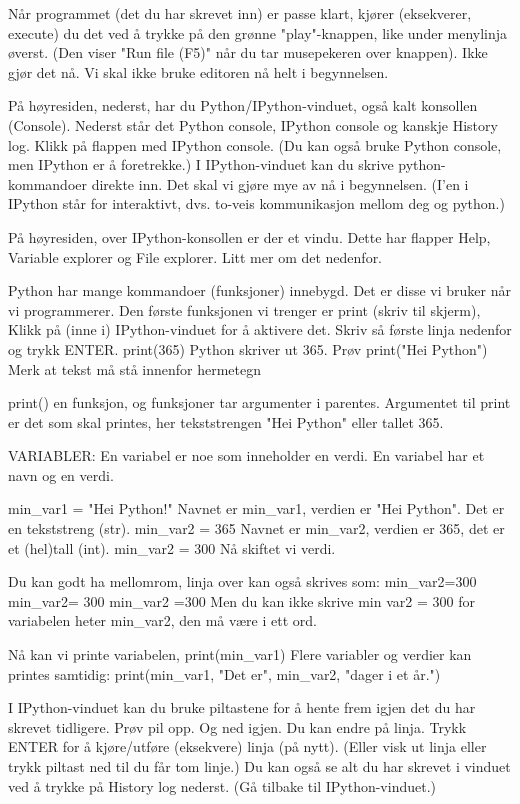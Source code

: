\documentclass[a4paper,11pt,utf8]{book}
\begin{document}
Når programmet (det du har skrevet inn) er passe klart, kjører (eksekverer, execute)
du det ved å trykke på den grønne "play"-knappen, like under menylinja øverst.
(Den viser "Run file (F5)" når du tar musepekeren over knappen).
Ikke gjør det nå. Vi skal ikke bruke editoren nå helt i begynnelsen.


På høyresiden, nederst, har du Python/IPython-vinduet, også kalt konsollen (Console).
Nederst står det Python console, IPython console og kanskje History log. 
Klikk på flappen med IPython console.
(Du kan også bruke Python console, men IPython er å foretrekke.) 
I IPython-vinduet kan du skrive python-kommandoer direkte inn. 
Det skal vi gjøre mye av nå i begynnelsen. 
(I'en i IPython står for interaktivt, dvs. to-veis kommunikasjon mellom deg og python.) 


På høyresiden, over IPython-konsollen er der et vindu.
Dette har flapper Help, Variable explorer og File explorer.
Litt mer om det nedenfor. 


Python har mange kommandoer (funksjoner) innebygd.
Det er disse vi bruker når vi programmerer. 
Den første funksjonen vi trenger er print (skriv til skjerm), 
Klikk på (inne i) IPython-vinduet for å aktivere det.
Skriv så første linja nedenfor og trykk ENTER.
print(365)
Python skriver ut 365.
Prøv 
print("Hei Python")
Merk at tekst må stå innenfor hermetegn


print() en funksjon, og funksjoner tar argumenter i parentes.
Argumentet til print er det som skal printes, her tekststrengen "Hei Python" eller tallet 365. 

VARIABLER: 
En variabel er noe som inneholder en verdi. 
En variabel har et navn og en verdi.

min_var1 = "Hei Python!"
Navnet er min_var1, verdien er "Hei Python". Det er en tekststreng (str). 
min_var2 = 365
Navnet er min_var2, verdien er 365, det er et (hel)tall (int). 
min_var2 = 300
Nå skiftet vi verdi. 

Du kan godt ha mellomrom, linja over kan også skrives som: 
min_var2=300
min_var2= 300
min_var2 =300
Men du kan ikke skrive
min var2 = 300
for variabelen heter min_var2, den må være i ett ord. 

Nå kan vi printe variabelen, 
print(min_var1)
Flere variabler og verdier kan printes samtidig: 
print(min_var1, "Det er", min_var2, "dager i et år.") 

I IPython-vinduet kan du bruke piltastene for å hente frem igjen det du har skrevet tidligere. 
Prøv pil opp. Og ned igjen. 
Du kan endre på linja. 
Trykk ENTER for å kjøre/utføre (eksekvere) linja (på nytt).
(Eller visk ut linja eller trykk piltast ned til du får tom linje.)
Du kan også se alt du har skrevet i vinduet ved å trykke på History log nederst.
(Gå tilbake til IPython-vinduet.) 
\end{document}
